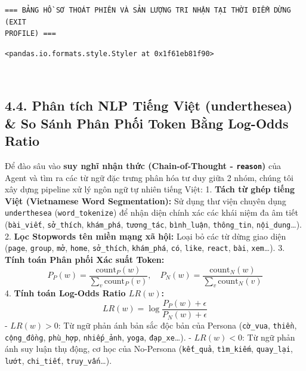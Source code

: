 \documentclass[11pt]{article}
\begin{document}
    \begin{Verbatim}[commandchars=\\\{\}]
=== BẢNG HỒ SƠ THOÁT PHIÊN VÀ SẢN LƯỢNG TRI NHẬN TẠI THỜI ĐIỂM DỪNG (EXIT
PROFILE) ===
    \end{Verbatim}

    
    \begin{Verbatim}[commandchars=\\\{\}]
<pandas.io.formats.style.Styler at 0x1f61eb81f90>
    \end{Verbatim}

    
    \begin{center}
    \end{center}
    { \hspace*{\fill} \\}
    
    \subsection{4.4. Phân tích NLP Tiếng Việt (underthesea) \& So Sánh Phân
Phối Token Bằng Log-Odds
Ratio}\label{phuxe2n-tuxedch-nlp-tiux1ebfng-viux1ec7t-underthesea-so-suxe1nh-phuxe2n-phux1ed1i-token-bux1eb1ng-log-odds-ratio}

Để đào sâu vào \textbf{suy nghĩ nhận thức (Chain-of-Thought -
\texttt{reason})} của Agent và tìm ra các từ ngữ đặc trưng phân hóa tư
duy giữa 2 nhóm, chúng tôi xây dựng pipeline xử lý ngôn ngữ tự nhiên
tiếng Việt: 1. \textbf{Tách từ ghép tiếng Việt (Vietnamese Word
Segmentation):} Sử dụng thư viện chuyên dụng \texttt{underthesea}
(\texttt{word\_tokenize}) để nhận diện chính xác các khái niệm đa âm
tiết (\texttt{bài\_viết}, \texttt{sở\_thích}, \texttt{khám\_phá},
\texttt{tương\_tác}, \texttt{bình\_luận}, \texttt{thông\_tin},
\texttt{nội\_dung}\ldots). 2. \textbf{Lọc Stopwords tên miền mạng xã
hội:} Loại bỏ các từ dừng giao diện (\texttt{page}, \texttt{group},
\texttt{mở}, \texttt{home}, \texttt{sở\_thích}, \texttt{khám\_phá},
\texttt{có}, \texttt{like}, \texttt{react}, \texttt{bài},
\texttt{xem}\ldots). 3. \textbf{Tính toán Phân phối Xác suất Token:}
\[P_P(w) = \frac{\text{count}_P(w)}{\sum_v \text{count}_P(v)}, \quad P_N(w) = \frac{\text{count}_N(w)}{\sum_v \text{count}_N(v)}\]
4. \textbf{Tính toán Log-Odds Ratio \(LR(w)\):}
\[LR(w) = \log\frac{P_P(w) + \epsilon}{P_N(w) + \epsilon}\] -
\(LR(w) > 0\): Từ ngữ phản ánh bản sắc độc bản của Persona
(\texttt{cờ\_vua}, \texttt{thiền}, \texttt{cộng\_đồng},
\texttt{phù\_hợp}, \texttt{nhiếp\_ảnh}, \texttt{yoga},
\texttt{đạp\_xe}\ldots). - \(LR(w) < 0\): Từ ngữ phản ánh suy luận thụ
động, cơ học của No-Persona (\texttt{kết\_quả}, \texttt{tìm\_kiếm},
\texttt{quay\_lại}, \texttt{lướt}, \texttt{chi\_tiết},
\texttt{truy\_vấn}\ldots).
\end{document}
